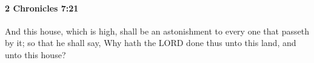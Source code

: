 
		\paragraph{2 Chronicles 7:21} %
			\label{2CHRONICLES-7-21}

			And this house, which is high, shall be an astonishment to every one that passeth by it; so that he shall say, Why hath the LORD done thus unto this land, and unto this house?


